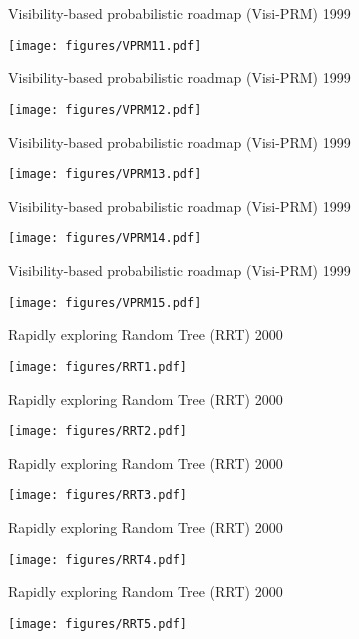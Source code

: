 \begin{frame} {Visibility-based probabilistic roadmap (Visi-PRM) 1999}
\centerline {
  \texttt{[image: figures/VPRM11.pdf]}
}
\end{frame}

\begin{frame} {Visibility-based probabilistic roadmap (Visi-PRM) 1999}
\centerline {
  \texttt{[image: figures/VPRM12.pdf]}
}
\end{frame}

\begin{frame} {Visibility-based probabilistic roadmap (Visi-PRM) 1999}
\centerline {
  \texttt{[image: figures/VPRM13.pdf]}
}
\end{frame}

\begin{frame} {Visibility-based probabilistic roadmap (Visi-PRM) 1999}
\centerline {
  \texttt{[image: figures/VPRM14.pdf]}
}
\end{frame}

\begin{frame} {Visibility-based probabilistic roadmap (Visi-PRM) 1999}
\centerline {
  \texttt{[image: figures/VPRM15.pdf]}
}
\end{frame}

%
%

\begin{frame} {Rapidly exploring Random Tree (RRT) 2000}
\centerline {
  \texttt{[image: figures/RRT1.pdf]}
}
\end{frame}

\begin{frame} {Rapidly exploring Random Tree (RRT) 2000}
\centerline {
  \texttt{[image: figures/RRT2.pdf]}
}
\end{frame}

\begin{frame} {Rapidly exploring Random Tree (RRT) 2000}
\centerline {
  \texttt{[image: figures/RRT3.pdf]}
}
\end{frame}

\begin{frame} {Rapidly exploring Random Tree (RRT) 2000}
\centerline {
  \texttt{[image: figures/RRT4.pdf]}
}
\end{frame}

\begin{frame} {Rapidly exploring Random Tree (RRT) 2000}
\centerline {
  \texttt{[image: figures/RRT5.pdf]}
}
\end{frame}

